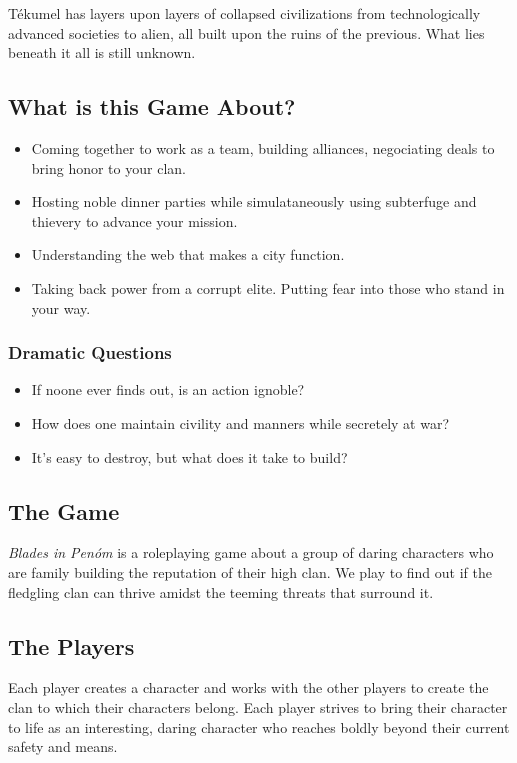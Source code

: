 Tékumel has layers upon layers of collapsed civilizations from technologically advanced societies to alien, all built upon the ruins of the previous. What lies beneath it all is still unknown.


\subsection{What is this Game About?}

\begin{itemize}
\item Coming together to work as a team, building alliances, negociating deals to bring honor to your clan.
\item Hosting noble dinner parties while simulataneously using subterfuge and thievery to advance your mission.
\item Understanding the web that makes a city function.
\item Taking back power from a corrupt elite. Putting fear into those who stand in your way.
\end{itemize}

\subsubsection{Dramatic Questions}

\begin{itemize}
\item If noone ever finds out, is an action ignoble?
\item How does one maintain civility and manners while secretely at war?
\item It's easy to destroy, but what does it take to build?
\end{itemize}

\subsection{The Game}

\emph{Blades in Penóm} is a roleplaying game about a group of daring characters who are family building the reputation of their high clan. We play to find out if the fledgling clan can thrive amidst the teeming threats that surround it.

\subsection{The Players}

Each player creates a character and works with the other players to create the clan to which their characters belong. Each player strives to bring their character to life as an interesting, daring character who reaches boldly beyond their current safety and means.

